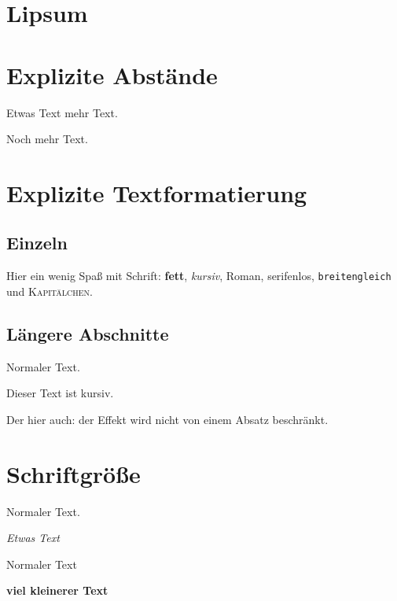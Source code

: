 \documentclass[a4paper]{article}
\begin{document}
\section{Lipsum}
\lipsum[1-5]{}

\newpage
\section{Explizite Abstände}

Etwas Text \hspace{1cm} mehr Text.

\vspace{10cm}

Noch mehr Text.

\section{Explizite Textformatierung}

\subsection{Einzeln}

Hier ein wenig Spaß mit Schrift: \textbf{fett}, \textit{kursiv},
\textrm{Roman}, \textsf{serifenlos}, \texttt{breitengleich} und
\textsc{Kapitälchen}.

\subsection{Längere Abschnitte}

Normaler Text.

    {\itshape{}

        Dieser Text ist kursiv.

        Der hier auch: der Effekt wird nicht von einem Absatz beschränkt.\/

    }

\section{Schriftgröße}

Normaler Text.

\begin{center}
    {\itshape\large Etwas Text\par}
    Normaler Text
        {\bfseries\small viel kleinerer Text\par}
\end{center}
\end{document}
